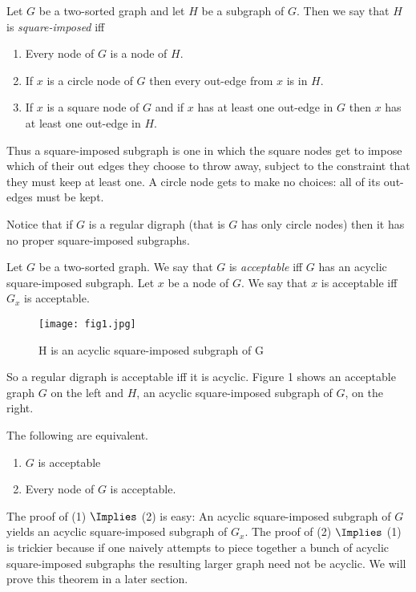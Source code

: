\documentclass[oneside,12pt]{amsart}
\begin{document}
\begin{definition}
Let $G$ be a two-sorted graph and let $H$ be a subgraph of $G$. Then we say that
$H$ is \emph{square-imposed} iff
\begin{enumerate}
\item Every node of $G$ is a node of $H$.
\item If $x$ is a circle node of $G$ then every out-edge from $x$ is in $H$.
\item If $x$ is a square node of $G$ and if $x$ has at least one out-edge
in $G$ then $x$ has at least one out-edge in $H$.
\end{enumerate}

Thus a square-imposed subgraph is one in which the square nodes get to impose
which of their out edges they choose to throw away, subject to the constraint that
they must keep at least one. A circle node gets to make
no choices: all of its out-edges must be kept. 

Notice that if $G$ is a regular digraph (that is $G$ has only circle nodes) then it
has no proper square-imposed subgraphs.

\begin{definition}
Let $G$ be a two-sorted graph. We say that $G$ is \emph{acceptable} iff $G$ has
an acyclic square-imposed subgraph. Let $x$ be a node of $G$. We say that $x$ is
acceptable iff $G_x$ is acceptable.
\end{definition}

\begin{figure}[h]
    \centering
    \texttt{[image: fig1.jpg]}
    \caption{H is an acyclic square-imposed subgraph of G}
    \label{fig:fig1}
\end{figure}

So a regular digraph is acceptable iff it is acyclic. Figure 1 shows an acceptable graph $G$ on the left
and $H$, an acyclic square-imposed subgraph of $G$, on the right.

\FloatBarrier

\begin{theorem}
\label{Acceptability-Is-Local}
The following are equivalent.
\begin{enumerate}
\item $G$ is acceptable
\item Every node of $G$ is acceptable.
\end{enumerate}
\end{theorem}

The proof of (1) $\Implies$ (2) is easy:  An acyclic square-imposed subgraph of $G$
yields an acyclic square-imposed subgraph of $G_x$. The proof of (2) $\Implies$ (1)
is trickier because if one naively attempts to piece together a bunch of acyclic square-imposed
subgraphs the resulting larger graph need not be acyclic. We will prove this theorem in a later section.

\end{definition}
\end{document}
